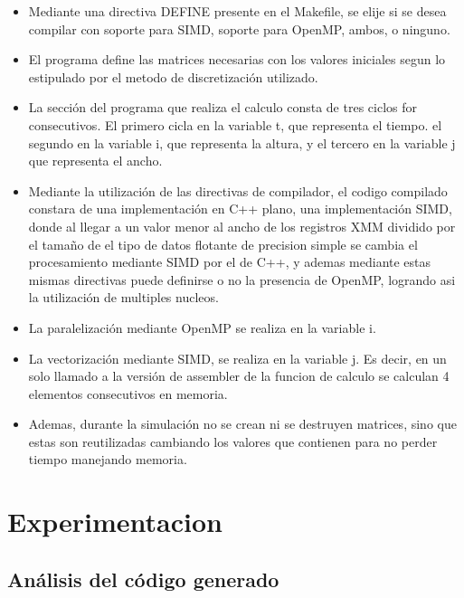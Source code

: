 \begin{itemize}
	\item Mediante una directiva DEFINE presente en el Makefile, se elije si se desea compilar con soporte para SIMD, soporte para OpenMP, ambos, o ninguno.
	\item El programa define las matrices necesarias con los valores iniciales segun lo estipulado por el metodo de discretización utilizado.
	\item La sección del programa que realiza el calculo consta de tres ciclos for consecutivos. El primero cicla en la variable t, que representa el tiempo. el segundo en la variable i, que representa la altura, y el tercero en la variable j que representa el ancho.
	\item Mediante la utilización de las directivas de compilador, el codigo compilado constara de una implementación en C++ plano, una implementación SIMD, donde al llegar a un valor menor al ancho de los registros XMM dividido por el tamaño de el tipo de datos flotante de precision simple se cambia el procesamiento mediante SIMD por el de C++, y ademas mediante estas mismas directivas puede definirse o no la presencia de OpenMP, logrando asi la utilización de multiples nucleos.

	\item La paralelización mediante OpenMP se realiza en la variable i.
	\item La vectorización mediante SIMD, se realiza en la variable j. Es decir, en un solo llamado a la versión de assembler de la funcion de calculo se calculan 4 elementos consecutivos en memoria.

	\item Ademas, durante la simulación no se crean ni se destruyen matrices, sino que estas son reutilizadas cambiando los valores que contienen para no perder tiempo manejando memoria.
\end{itemize}

\newpage
\section{Experimentacion}

\subsection{Análisis del código generado}

